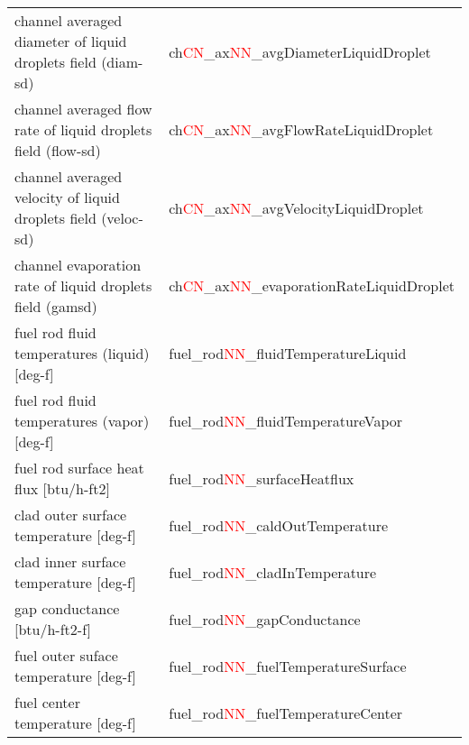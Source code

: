 \begin{itemize}
\begin{table}[h]
\begin{tabular}{|l|l|}
     channel averaged diameter of liquid droplets field (diam-sd) & ch\textcolor{red}{CN}\_ax\textcolor{red}{NN}\_avgDiameterLiquidDroplet \\ 
     channel averaged flow rate of liquid droplets field (flow-sd) & ch\textcolor{red}{CN}\_ax\textcolor{red}{NN}\_avgFlowRateLiquidDroplet \\ 
     channel averaged velocity of liquid droplets field (veloc-sd) & ch\textcolor{red}{CN}\_ax\textcolor{red}{NN}\_avgVelocityLiquidDroplet \\ 
     channel evaporation rate of liquid droplets field (gamsd) & ch\textcolor{red}{CN}\_ax\textcolor{red}{NN}\_evaporationRateLiquidDroplet \\ 
     fuel rod fluid temperatures (liquid) [deg-f] & fuel\_rod\textcolor{red}{NN}\_fluidTemperatureLiquid \\
     fuel rod fluid temperatures (vapor) [deg-f] & fuel\_rod\textcolor{red}{NN}\_fluidTemperatureVapor \\
     fuel rod surface heat flux [btu/h-ft2] & fuel\_rod\textcolor{red}{NN}\_surfaceHeatflux \\
     clad outer surface temperature [deg-f] & fuel\_rod\textcolor{red}{NN}\_caldOutTemperature \\
     clad inner surface temperature [deg-f] & fuel\_rod\textcolor{red}{NN}\_cladInTemperature \\
     gap conductance [btu/h-ft2-f] & fuel\_rod\textcolor{red}{NN}\_gapConductance \\
     fuel outer suface temperature [deg-f] & fuel\_rod\textcolor{red}{NN}\_fuelTemperatureSurface \\
     fuel center temperature [deg-f] & fuel\_rod\textcolor{red}{NN}\_fuelTemperatureCenter \\
        
    \end{tabular}

   \end{table}
\end{itemize}

